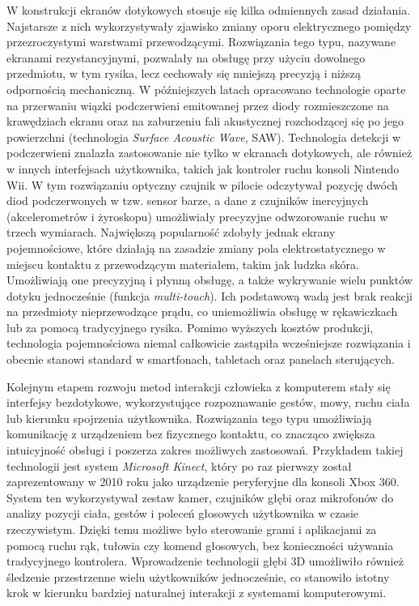 W konstrukcji ekranów dotykowych stosuje się kilka odmiennych zasad działania. Najstarsze z nich wykorzystywały zjawisko zmiany oporu elektrycznego pomiędzy przezroczystymi warstwami przewodzącymi. Rozwiązania tego typu, nazywane ekranami rezystancyjnymi, pozwalały na obsługę przy użyciu dowolnego przedmiotu, w tym rysika, lecz cechowały się mniejszą precyzją i niższą odpornością mechaniczną. W późniejszych latach opracowano technologie oparte na przerwaniu wiązki podczerwieni emitowanej przez diody rozmieszczone na krawędziach ekranu oraz na zaburzeniu fali akustycznej rozchodzącej się po jego powierzchni (technologia \textit{Surface Acoustic Wave}, SAW). Technologia detekcji w podczerwieni znalazła zastosowanie nie tylko w ekranach dotykowych, ale również w innych interfejsach użytkownika, takich jak kontroler ruchu konsoli Nintendo Wii. W tym rozwiązaniu optyczny czujnik w pilocie odczytywał pozycję dwóch diod podczerwonych w tzw. sensor barze, a dane z czujników inercyjnych (akcelerometrów i żyroskopu) umożliwiały precyzyjne odwzorowanie ruchu w trzech wymiarach. Największą popularność zdobyły jednak ekrany pojemnościowe, które działają na zasadzie zmiany pola elektrostatycznego w miejscu kontaktu z przewodzącym materiałem, takim jak ludzka skóra. Umożliwiają one precyzyjną i płynną obsługę, a także wykrywanie wielu punktów dotyku jednocześnie (funkcja \textit{multi-touch}). Ich podstawową wadą jest brak reakcji na przedmioty nieprzewodzące prądu, co uniemożliwia obsługę w rękawiczkach lub za pomocą tradycyjnego rysika. Pomimo wyższych kosztów produkcji, technologia pojemnościowa niemal całkowicie zastąpiła wcześniejsze rozwiązania i obecnie stanowi standard w smartfonach, tabletach oraz panelach sterujących.

Kolejnym etapem rozwoju metod interakcji człowieka z komputerem stały się interfejsy bezdotykowe, wykorzystujące rozpoznawanie gestów, mowy, ruchu ciała lub kierunku spojrzenia użytkownika. Rozwiązania tego typu umożliwiają komunikację z urządzeniem bez fizycznego kontaktu, co znacząco zwiększa intuicyjność obsługi i poszerza zakres możliwych zastosowań. Przykładem takiej technologii jest system \textit{Microsoft Kinect}, który po raz pierwszy został zaprezentowany w 2010 roku jako urządzenie peryferyjne dla konsoli Xbox 360. System ten wykorzystywał zestaw kamer, czujników głębi oraz mikrofonów do analizy pozycji ciała, gestów i poleceń głosowych użytkownika w czasie rzeczywistym. Dzięki temu możliwe było sterowanie grami i aplikacjami za pomocą ruchu rąk, tułowia czy komend głosowych, bez konieczności używania tradycyjnego kontrolera. Wprowadzenie technologii głębi 3D umożliwiło również śledzenie przestrzenne wielu użytkowników jednocześnie, co stanowiło istotny krok w kierunku bardziej naturalnej interakcji z systemami komputerowymi.

